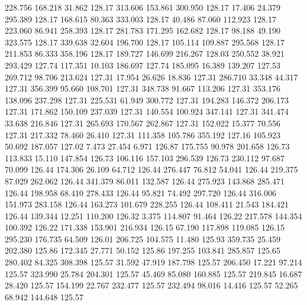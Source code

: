  228.756  168.218   31.862       128.17
 313.606  153.861  300.950       128.17
  17.406   24.379  295.389       128.17
 168.615   80.363  333.003       128.17
  40.486   87.060  112.923       128.17
 223.060   86.941  258.393       128.17
 281.783  171.295  162.682       128.17
  98.188   49.190  323.575       128.17
 339.638   32.604  196.700       128.17
 105.114  109.887  295.568       128.17
 211.853   86.333  358.196       128.17
 189.727  146.699  216.267       128.03
 250.552   38.921  293.429       127.74
 117.351   10.103  186.697       127.74
 185.095   16.389  139.207       127.53
 269.712   98.706  213.624       127.31
  17.954   26.626   18.836       127.31
 286.710   33.348   44.317       127.31
 356.399   95.660  108.701       127.31
 348.738   91.667  113.206       127.31
 353.176  138.096  237.298       127.31
 225.531   61.949  300.772       127.31
 194.283  146.372  206.173       127.31
 171.862  150.109  237.039       127.31
 140.554  100.924  347.141       127.31
 341.474   33.638  216.846       127.31
 265.693  170.567  262.867       127.31
 152.022   15.377   70.556       127.31
 217.332   78.460   26.410       127.31
 111.358  105.786  355.192       127.16
 105.923   50.692  187.057       127.02
   7.473   27.454    6.971       126.87
 175.755   90.978  201.658       126.73
 113.833   15.110  147.854       126.73
 106.116  157.103  296.539       126.73
 230.112   97.687   70.099       126.44
 174.306   26.109   64.712       126.44
 276.447   76.812   54.041       126.44
 219.375   87.029  262.062       126.44
 341.379   86.011  132.587       126.44
 275.923  143.868  285.471       126.44
 198.958   68.410  278.433       126.44
  95.821   74.492  297.720       126.44
 316.006  151.973  283.158       126.44
 163.273  101.679  228.255       126.44
 108.411   21.543  184.421       126.44
 139.344   12.251  110.200       126.32
   3.375  114.807   91.464       126.22
 217.578  144.354  100.392       126.22
 171.338  153.901  216.934       126.15
  67.190  117.898  119.085       126.15
 295.230  176.735   64.509       126.01
 206.725  104.575   11.480       125.93
 359.735   25.459  202.380       125.86
 172.345   27.771   50.152       125.86
 197.255  103.841  285.857       125.65
 280.402   84.325  308.398       125.57
  31.592   47.919  187.798       125.57
 206.450   17.221   97.214       125.57
 323.990   25.784  204.301       125.57
  45.469   85.080  160.885       125.57
 219.845   16.687   28.420       125.57
 154.199   22.767  232.477       125.57
 232.494   98.016   14.416       125.57
  52.265   68.942  144.648       125.57
